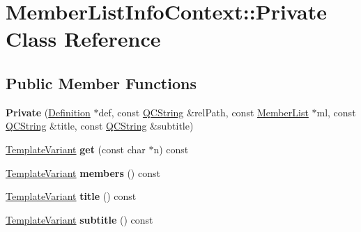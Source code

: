 \hypertarget{class_member_list_info_context_1_1_private}{}\section{Member\+List\+Info\+Context\+::Private Class Reference}
\label{class_member_list_info_context_1_1_private}
\subsection*{Public Member Functions}
\begin{DoxyCompactItemize}
\item 
\mbox{\label{class_member_list_info_context_1_1_private_a80904139878505daff26adfabcd5f015}} 
{\bfseries Private} (\mbox{\hyperlink{class_definition}{Definition}} $\ast$def, const \mbox{\hyperlink{class_q_c_string}{Q\+C\+String}} \&rel\+Path, const \mbox{\hyperlink{class_member_list}{Member\+List}} $\ast$ml, const \mbox{\hyperlink{class_q_c_string}{Q\+C\+String}} \&title, const \mbox{\hyperlink{class_q_c_string}{Q\+C\+String}} \&subtitle)
\item 
\mbox{\label{class_member_list_info_context_1_1_private_a9d9a4fe39189b4b0e8e34f19d81ce917}} 
\mbox{\hyperlink{class_template_variant}{Template\+Variant}} {\bfseries get} (const char $\ast$n) const
\item 
\mbox{\label{class_member_list_info_context_1_1_private_ab3edf412306409e36113f60e08b81fa5}} 
\mbox{\hyperlink{class_template_variant}{Template\+Variant}} {\bfseries members} () const
\item 
\mbox{\label{class_member_list_info_context_1_1_private_aedfa436705313422523963f58470b905}} 
\mbox{\hyperlink{class_template_variant}{Template\+Variant}} {\bfseries title} () const
\item 
\mbox{\label{class_member_list_info_context_1_1_private_a3c294d17a247887e4342e7099ea90d1f}} 
\mbox{\hyperlink{class_template_variant}{Template\+Variant}} {\bfseries subtitle} () const
\item 
\mbox{\label{class_member_list_info_context_1_1_private_a4e9b508dbfdb835a94f65437b4490596}} 

\end{DoxyCompactItemize}
